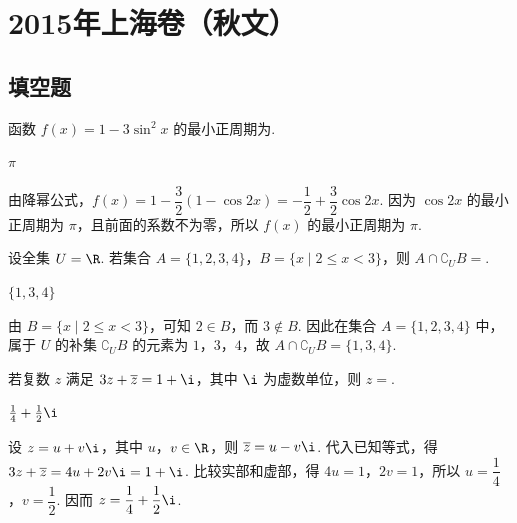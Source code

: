 
\chapter{2015年上海卷（秋文）}

\section{填空题}

\begin{problem}
函数 \( f(x)=1-3\sin^{2}x \) 的最小正周期为\fillinblank{}.
\end{problem}

\begin{answer}
\(\pi\)
\end{answer}

\begin{solution}
由降幂公式，\(f(x)=1-\dfrac{3}{2}\left(1-\cos 2x\right)=-\dfrac{1}{2}+\dfrac{3}{2}\cos 2x\). 因为 \(\cos 2x\) 的最小正周期为 \(\pi\)，且前面的系数不为零，所以 \(f(x)\) 的最小正周期为 \(\pi\).
\end{solution}

\begin{problem}
设全集 \(U = \R\). 若集合 \( A = \{1, 2, 3, 4\} \)，\( B = \{x \mid 2 \leqslant x < 3\} \)，则 \( A \cap \complement_U B = \)\fillinblank{}.
\end{problem}

\begin{answer}
\(\{1,3,4\}\)
\end{answer}

\begin{solution}
由 \(B=\{x\mid 2\leqslant x<3\}\)，可知 \(2\in B\)，而 \(3\notin B\). 因此在集合 \(A=\{1,2,3,4\}\) 中，属于 \(U\) 的补集 \(\complement_U B\) 的元素为 \(1\)，\(3\)，\(4\)，故 \(A\cap\complement_U B=\{1,3,4\}\).
\end{solution}

\begin{problem}
若复数 \(z\) 满足 \( 3z + \overline{z} = 1 + \i \)，其中 \(\i\) 为虚数单位，则 \(z =\)\fillinblank{}.
\end{problem}

\begin{answer}
\(\frac{1}{4}+\frac{1}{2}\i\)
\end{answer}

\begin{solution}
设 \(z=u+v\i\)，其中 \(u\)，\(v\in\R\)，则 \(\overline{z}=u-v\i\). 代入已知等式，得 \(3z+\overline{z}=4u+2v\i=1+\i\). 比较实部和虚部，得 \(4u=1\)，\(2v=1\)，所以 \(u=\dfrac14\)，\(v=\dfrac12\). 因而 \(z=\dfrac14+\dfrac12\i\).
\end{solution}

